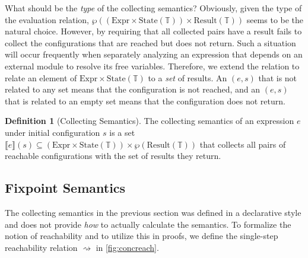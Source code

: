 \documentclass[acmsmall,screen,review]{acmart}
\theoremstyle{definition}
\newtheorem{definition}{Definition}[section]
\newcommand*{\Expr}{\text{Expr}}
\newcommand*{\Time}{\mathbb{T}}
\newcommand*{\Config}[1]{\text{State}({#1})}
\newcommand*{\Result}[1]{\text{Result}({#1})}
\newcommand*{\sembracket}[1]{\lBrack{#1}\rBrack}
\begin{document}
What should be the \emph{type} of the collecting semantics?
Obviously, given the type of the evaluation relation, $\wp((\Expr\times\Config{\Time})\times\Result{\Time})$ seems to be the natural choice.
However, by requiring that all collected pairs have a result fails to collect the configurations that are reached but does not return.
Such a situation will occur frequently when separately analyzing an expression that depends on an external module to resolve its free variables.
Therefore, we extend the relation to relate an element of $\Expr\times\Config\Time$ to a \emph{set} of results.
An $(e,s)$ that is not related to any set means that the configuration is not reached, and an $(e,s)$ that is related to an empty set means that the configuration does not return.

\begin{definition}[Collecting Semantics]
  The collecting semantics of an expression $e$ under initial configuration $s$ is a set $\sembracket{e}(s)\subseteq(\Expr\times\Config\Time)\times\wp(\Result{\Time})$ that collects all pairs of reachable configurations with the set of results they return.
\end{definition}

\subsection{Fixpoint Semantics}

The collecting semantics in the previous section was defined in a declarative style and does not provide \emph{how} to actually calculate the semantics.
To formalize the notion of reachability and to utilize this in proofs, we define the single-step reachability relation $\rightsquigarrow$ in \ref{fig:concreach}.
\end{document}
